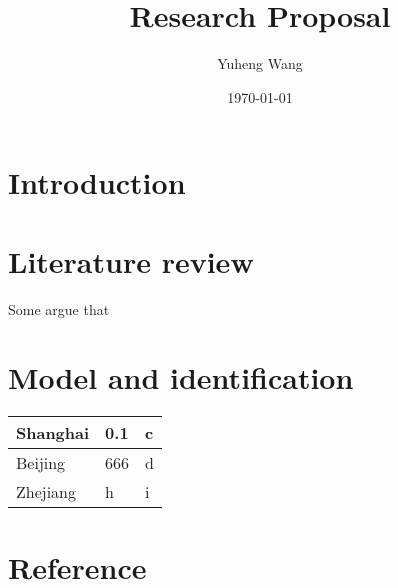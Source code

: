 \documentclass{article}
\title{Research Proposal}
\author{Yuheng Wang}
\date{\today}
\begin{document}
\maketitle
\section{Introduction}\label{first_section}

\section{Literature review}\label{second_section}

Some argue that \cite{borjas1992self}
\section{Model and identification}\label{third_section}

\begin{tabular}{lll}
  \toprule
  Shanghai & 0.1 & c \\
  \midrule
  Beijing & 666 & d \\
  Zhejiang & h & i \\
  \bottomrule
\end{tabular}

\section{Reference}\label{reference}



\end{document}
